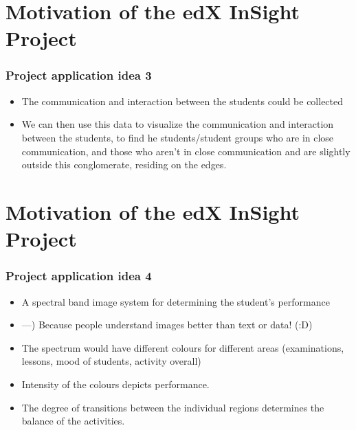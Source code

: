 \documentclass[12pt,xcolor=dvipsnames]{beamer}
\begin{document}
\section{Motivation of the edX InSight Project}
\begin{frame}[t]
\frametitle{Project application idea 3}

\begin{itemize}
\item The communication and interaction between the students could be collected
\hfill
\item We can then use this data to visualize the communication and interaction between the students, to find he students/student groups who are in close communication, and those who aren't in close communication and are slightly outside this conglomerate, residing on the edges.
\end{itemize}
\end{frame}

\section{Motivation of the edX InSight Project}
\begin{frame}[t]
\frametitle{Project application idea 4}

\begin{itemize}
\item A spectral band image system for determining the student's performance
\item ---) Because people understand images better than text or data! (:D)
\item The spectrum would have different colours for different areas (examinations, lessons, mood of students, activity overall)
\item Intensity of the colours depicts performance.
\item The degree of transitions between the individual regions determines the balance of the activities.

\end{itemize}
\end{frame}

\end{document}
